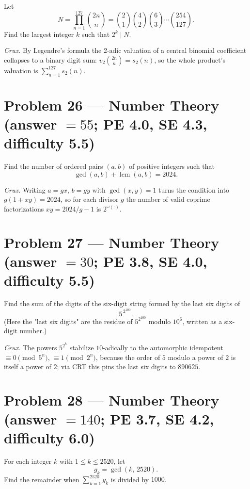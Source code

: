 \documentclass[11pt]{article}
\begin{document}
Let
$$N=\prod_{n=1}^{127}\binom{2n}{n}=\binom{2}{1}\binom{4}{2}\binom{6}{3}\cdots\binom{254}{127}.$$
Find the largest integer $k$ such that $2^{k}\mid N$.

\medskip

\textit{Crux.} By Legendre's formula the 2-adic valuation of a central binomial coefficient collapses to a binary digit sum: $v_2\binom{2n}{n}=s_2(n)$, so the whole product's valuation is $\sum_{n=1}^{127}s_2(n)$.

\section*{Problem 26 --- Number Theory \quad (answer $=55$; PE 4.0, SE 4.3, difficulty 5.5)}

Find the number of ordered pairs $(a,b)$ of positive integers such that
$$\gcd(a,b) + \operatorname{lcm}(a,b) = 2024.$$

\medskip

\textit{Crux.} Writing $a=gx,\,b=gy$ with $\gcd(x,y)=1$ turns the condition into $g(1+xy)=2024$, so for each divisor $g$ the number of valid coprime factorizations $xy=2024/g-1$ is $2^{\omega(\cdot)}$.

\section*{Problem 27 --- Number Theory \quad (answer $=30$; PE 3.8, SE 4.0, difficulty 5.5)}

Find the sum of the digits of the six-digit string formed by the last six digits of
$$5^{\,2^{100}}.$$
(Here the "last six digits" are the residue of $5^{2^{100}}$ modulo $10^6$, written as a six-digit number.)

\medskip

\textit{Crux.} The powers $5^{2^k}$ stabilize $10$-adically to the automorphic idempotent $\equiv 0 \pmod{5^n}$, $\equiv 1 \pmod{2^n}$, because the order of $5$ modulo a power of $2$ is itself a power of $2$; via CRT this pins the last six digits to $890625$.

\section*{Problem 28 --- Number Theory \quad (answer $=140$; PE 3.7, SE 4.2, difficulty 6.0)}

For each integer $k$ with $1 \le k \le 2520$, let
$$g_k = \gcd(k,\,2520).$$
Find the remainder when $\displaystyle\sum_{k=1}^{2520} g_k$ is divided by $1000$.
\end{document}
